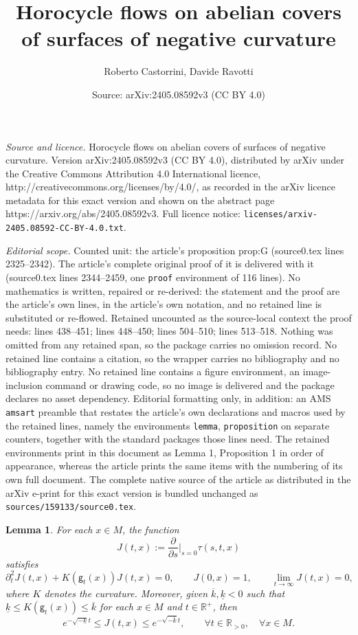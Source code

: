 \documentclass[10pt,a4paper]{amsart}
\title{Horocycle flows on abelian covers of surfaces of negative curvature}
\author{Roberto Castorrini, Davide Ravotti}
\date{Source: arXiv:2405.08592v3 (CC BY 4.0)}
\newtheorem{lemma}{Lemma}
\newcommand \R {{ \mathbb R}}
\newcommand{\geo}{\mathsf{g}}
\begin{document}
\maketitle

\noindent\emph{Source and licence.} Horocycle flows on abelian covers of surfaces of negative curvature. Version arXiv:2405.08592v3 (CC BY 4.0), distributed by arXiv under the Creative Commons Attribution 4.0 International licence, http://creativecommons.org/licenses/by/4.0/, as recorded in the arXiv licence metadata for this exact version and shown on the abstract page https://arxiv.org/abs/2405.08592v3. Full licence notice: \texttt{licenses/arxiv-2405.08592-CC-BY-4.0.txt}.\par\smallskip

\noindent\textit{Editorial scope.} Counted unit: the article's proposition prop:G (source0.tex lines 2325--2342). The article's complete original proof of it is delivered with it (source0.tex lines 2344--2459, one \texttt{proof} environment of 116 lines). No mathematics is written, repaired or re-derived: the statement and the proof are the article's own lines, in the article's own notation, and no retained line is substituted or re-flowed.  Retained uncounted as the source-local context the proof needs: lines 438--451; lines 448--450; lines 504--510; lines 513--518.  Nothing was omitted from any retained span, so the package carries no omission record.  No retained line contains a citation, so the wrapper carries no bibliography and no bibliography entry.  No retained line contains a figure environment, an image-inclusion command or drawing code, so no image is delivered and the package declares no asset dependency.  Editorial formatting only, in addition: an AMS \texttt{amsart} preamble that restates the article's own declarations and macros used by the retained lines, namely the environments \texttt{lemma}, \texttt{proposition} on separate counters, together with the standard packages those lines need.  The retained environments print in this document as Lemma 1, Proposition 1 in order of appearance, whereas the article prints the same items with the numbering of its own full document.  The complete native source of the article as distributed in the arXiv e-print for this exact version is bundled unchanged as \texttt{sources/159133/source0.tex}.
\begin{lemma}\label{lemma:Jacobi}
For each $x\in M$, the function
\[
J(t,x) := \frac{\partial}{\partial s}\Big\vert_{s=0} \tau(s,t,x)
\]
satisfies
\[
\partial^2_{t}{J}(t,x) + K(\geo_t(x))J(t,x) =0, \qquad J(0,x)=1, \qquad \lim_{t \to \infty} J(t,x) = 0,
\]
where $K$ denotes the curvature. Moreover, given $\overline k, \underline k<0$ such that $\underline k \leq K(\geo_t(x)) \leq \overline k$ for each $x\in M$ and $t\in \R^+$, then
\begin{equation}\label{eq:Jbound}
e^{-\sqrt{-\underline k}t} \le J(t,x) \le e^{-\sqrt{-\overline k}t}, \qquad \forall t\in \R_{>0}, \quad \forall x\in M.
\end{equation}
\end{lemma}
\end{document}
